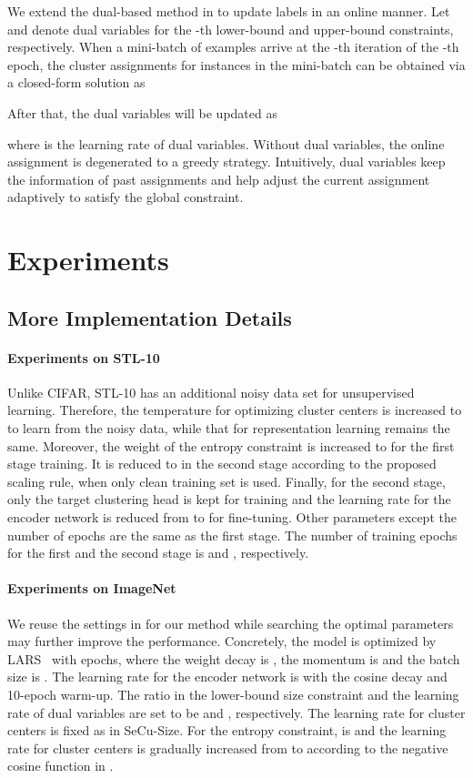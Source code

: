 \documentclass[10pt,twocolumn,letterpaper]{article}
\begin{document}
We extend the dual-based method in \cite{coke} to update labels in an online manner. Let  and  denote dual variables for the -th lower-bound and upper-bound constraints, respectively. When a mini-batch of  examples arrive at the -th iteration of the -th epoch, the cluster assignments for instances in the mini-batch can be obtained via a closed-form solution as

After that, the dual variables will be updated as

where  is the learning rate of dual variables. Without dual variables, the online assignment is degenerated to a greedy strategy. Intuitively, dual variables keep the information of past assignments and help adjust the current assignment adaptively to satisfy the global constraint. 

\section{Experiments}

\subsection{More Implementation Details} 

\paragraph{Experiments on STL-10} Unlike CIFAR, STL-10 has an additional noisy data set for unsupervised learning. Therefore, the temperature for optimizing cluster centers is increased to  to learn from the noisy data, while that for representation learning remains the same. Moreover, the weight of the entropy constraint is increased to  for the first stage training. It is reduced to  in the second stage according to the proposed scaling rule, when only clean training set is used. Finally, for the second stage, only the target clustering head is kept for training and the learning rate for the encoder network is reduced from  to  for fine-tuning. Other parameters except the number of epochs are the same as the first stage. The number of training epochs for the first and the second stage is  and , respectively.

\paragraph{Experiments on ImageNet} We reuse the settings in \cite{coke} for our method while searching the optimal parameters may further improve the performance. Concretely, the model is optimized by LARS~\cite{abs-1708-03888} with  epochs, where the weight decay is , the momentum is  and the batch size is . The learning rate for the encoder network is  with the cosine decay and 10-epoch warm-up. The ratio in the lower-bound size constraint and the learning rate of dual variables are set to be  and , respectively. The learning rate for cluster centers is fixed as  in SeCu-Size. For the entropy constraint,  is  and the learning rate for cluster centers is gradually increased from  to  according to the negative cosine function in . 
\end{document}
